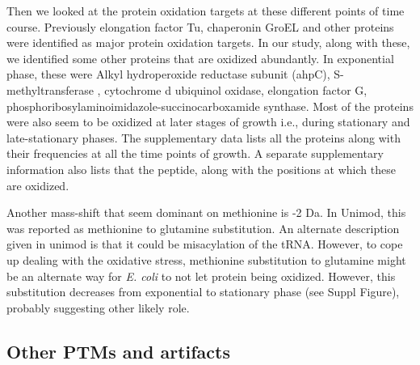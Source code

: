 \documentclass[12pt]{article}
\begin{document}
Then we looked at the protein oxidation targets at these different points of time course. Previously elongation factor Tu, chaperonin GroEL and other proteins were identified as major protein oxidation targets. In our study, along with these, we identified some other proteins that are oxidized abundantly. In exponential phase, these were Alkyl hydroperoxide reductase subunit (ahpC), S-methyltransferase , cytochrome d ubiquinol oxidase, elongation factor G, phosphoribosylaminoimidazole-succinocarboxamide synthase. Most of the proteins were also seem to be oxidized at later stages of growth i.e., during stationary and late-stationary phases. The supplementary data lists all the proteins along with their frequencies at all the time points of growth. A separate supplementary information also lists that the peptide, along with the positions at which these are oxidized.

Another mass-shift that seem dominant on methionine is -2 Da. In Unimod, this was reported as methionine to glutamine substitution. An alternate description given in unimod is that it could be misacylation of the tRNA. However, to cope up dealing with the oxidative stress, methionine substitution to glutamine might be an alternate way for \emph{E. coli} to not let protein being oxidized. However, this substitution decreases from exponential to stationary phase (see Suppl Figure), probably suggesting other likely role.

\subsection{Other PTMs and artifacts}
\end{document}

